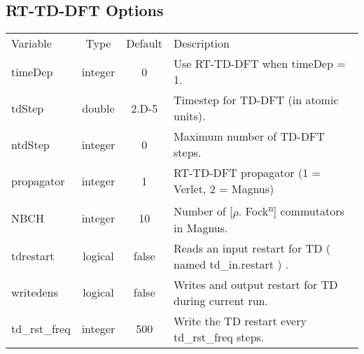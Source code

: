 \documentclass[journal=jctcce,manuscript=article]{achemso}
\begin{document}
    \subsection{RT-TD-DFT Options}
    \begin{table}  [H]
      \begin{center}
      \begin{tabular}{ l c c l}
         Variable      & Type    & Default & Description \\
         timeDep       & integer & 0       & Use RT-TD-DFT when timeDep = 1. \\
         tdStep        & double  & 2.D-5   & Timestep for TD-DFT (in atomic units). \\
         ntdStep       & integer & 0       & Maximum number of TD-DFT steps. \\
         propagator    & integer & 1       & RT-TD-DFT propagator (1 = Verlet, 2 = Magnus) \\
         NBCH          & integer & 10      & Number of [$\rho$. Fock\textsuperscript{n}] commutators in Magnus.\\
         tdrestart     & logical & false   & Reads an input restart for TD ( named td\_in.restart ) .\\
         writedens     & logical & false   & Writes and output restart for TD during current run.\\
         td\_rst\_freq & integer & 500     & Write the TD restart every td\_rst\_freq steps.\\
        \end{tabular}
       \end{center}
      \label{lio.tddft.var}
    \end{table}
    
\end{document}
